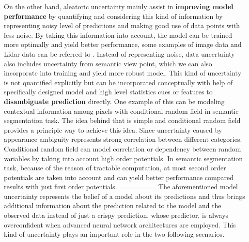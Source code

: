 On the other hand, aleatoric uncertainty mainly assist in \textbf{improving model performance} by quantifying and considering this kind of information by representing noisy level of predictions and making good use of data points with less noise. By taking this information into account, the model can be trained more optimally and yield better performance, some examples of image data and Lidar data can be referred to \cite{kendall2016modelling}\cite{feng2018towards}. Instead of representing noise, data uncertainty also includes uncertainty from semantic view point, which we can also incorporate into training and yield more robust model. This kind of uncertainty is not quantified explicitly but can be incorporated conceptually with help of specifically designed model and high level statistics cues or features to \textbf{disambiguate prediction} directly. One example of this can be modeling contextual information among pixels with conditional random field in semantic segmentation task\cite{krahenbuhl2011efficient}\cite{sutton2012introduction}\cite{lin2016efficient}. The idea behind that is simple and conditional random field provides a principle way to achieve this idea. Since uncertainty caused by appearance ambiguity represents strong correlation between different categories. Conditional random field can model correlation or dependency between random variables by taking into account high order potentials. In semantic segmentation task, because of the reason of tractable computation, at most second order potentials are taken into account and can yield better performance compared results with just first order potentials.
=======
The aforementioned model uncertainty represents the belief of a model about its predictions and thus brings additional information about the prediction related to the model and the observed data instead of just a crispy prediction, whose predictor, is always overconfident when advanced neural network architectures are employed\cite{guo2017calibration}. 
This kind of uncertainty plays an important role in the two following scenarios. 

